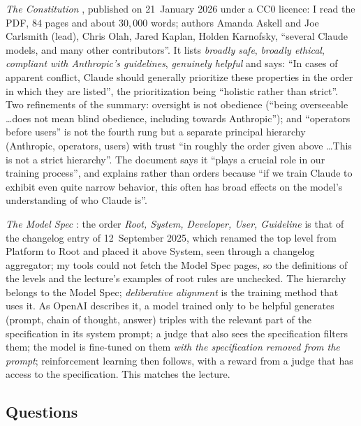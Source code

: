 \begin{beyond}\label{box:L6-docs}
\emph{The Constitution} \citep{anthropic2026constitution}, published on 21~January 2026 under a CC0 licence: I read the PDF, $84$ pages and about $30{,}000$ words; authors Amanda Askell and Joe Carlsmith (lead), Chris Olah, Jared Kaplan, Holden Karnofsky, ``several Claude models, and many other contributors''. It lists \emph{broadly safe}, \emph{broadly ethical}, \emph{compliant with Anthropic's guidelines}, \emph{genuinely helpful} and says: ``In cases of apparent conflict, Claude should generally prioritize these properties in the order in which they are listed'', the prioritization being ``holistic rather than strict''. Two refinements of the summary: oversight is not obedience (``being overseeable \dots does not mean blind obedience, including towards Anthropic''); and ``operators before users'' is not the fourth rung but a separate principal hierarchy (Anthropic, operators, users) with trust ``in roughly the order given above \dots This is not a strict hierarchy''. The document says it ``plays a crucial role in our training process'', and explains rather than orders because ``if we train Claude to exhibit even quite narrow behavior, this often has broad effects on the model's understanding of who Claude is''.

\emph{The Model Spec} \citep{openai2026spec}: the order \emph{Root, System, Developer, User, Guideline} is that of the changelog entry of 12~September 2025, which renamed the top level from Platform to Root and placed it above System, seen through a changelog aggregator; my tools could not fetch the Model Spec pages, so the definitions of the levels and the lecture's examples of root rules are unchecked. The hierarchy belongs to the Model Spec; \emph{deliberative alignment} \citep{guan2024} is the training method that uses it. As OpenAI describes it, a model trained only to be helpful generates (prompt, chain of thought, answer) triples with the relevant part of the specification in its system prompt; a judge that also sees the specification filters them; the model is fine-tuned on them \emph{with the specification removed from the prompt}; reinforcement learning then follows, with a reward from a judge that has access to the specification. This matches the lecture.
\end{beyond}

\subsection{Questions}\label{sec:L6-questions}
